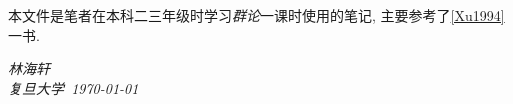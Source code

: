     本文件是笔者在本科二三年级时学习\emph{群论}一课时使用的笔记, 主要参考了\ref{Xu1994} 一书.

    \vspace{2cm}
    \begin{flushright}
        \textit{林海轩} \\[1em]
        \textit{复旦大学\ \today}
    \end{flushright}